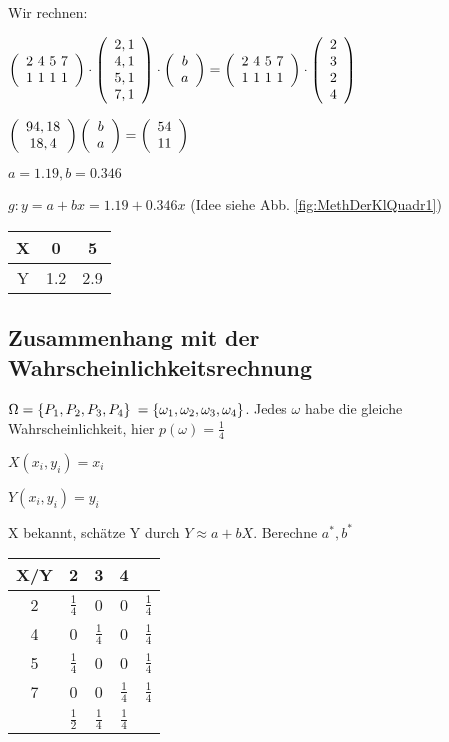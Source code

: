 Wir rechnen:

$
  \left(  \begin{array}{c} 2\ 4\ 5\ 7\\1\ 1\ 1\ 1 \end{array}  \right)  
\cdot
  \left(  \begin{array}{c} 2,1\\4,1\\5,1\\7,1 \end{array}  \right)  
\cdot
  \left(  \begin{array}{c} b\\a \end{array}  \right)  
=  \left(  \begin{array}{c} 2\ 4\ 5\ 7\\1\ 1\ 1\ 1 \end{array}  \right)  
\cdot 
  \left(  \begin{array}{c} 2\\3\\2\\4 \end{array}  \right)  
$

$
  \left(  \begin{array}{c} 94, 18\\18, 4 \end{array}  \right)  
  \left(  \begin{array}{c} b\\a \end{array}  \right)  
=
  \left(  \begin{array}{c} 54\\11 \end{array}  \right)  
$

$a = 1.19, b=0.346$

$g : y = a+bx = 1.19 + 0.346 x$ (Idee siehe Abb. \ref{fig:MethDerKlQuadr1})

\begin{tabular}{|c|c|c|}
\hline X & 0 & 5 \\ 
\hline Y & 1.2 & 2.9 \\ 
\hline 
\end{tabular} 

\subsection{Zusammenhang mit der Wahrscheinlichkeitsrechnung}
$ \Omega =  \left\lbrace P_1, P_2, P_3, P_4 \right\rbrace  $
$=  \left\lbrace \omega_1, \omega_2, \omega_3, \omega_4 \right\rbrace $.
Jedes $\omega$ habe die gleiche Wahrscheinlichkeit, hier $p(\omega) = \frac{1}{4}$

$X(x_i, y_i) = x_i$

$Y(x_i, y_i) = y_i$

X bekannt, schätze Y durch $Y\approx a + b X$. Berechne $a^*, b^*$

\begin{tabular}{|c|c|c|c|c|}
\hline X/Y & 2 & 3 & 4 &  \\ 
\hline 2 & $ \frac{1}{4} $ & 0 & 0 & $ \frac{1}{4} $ \\ 
\hline 4 & 0 & $ \frac{1}{4} $ & 0 & $ \frac{1}{4} $ \\ 
\hline 5 & $ \frac{1}{4} $ & 0 & 0 & $ \frac{1}{4} $ \\ 
\hline 7 & 0 & 0 & $ \frac{1}{4} $ & $ \frac{1}{4} $ \\ 
\hline & $ \frac{1}{2} $ & $ \frac{1}{4} $ & $ \frac{1}{4} $ & \\
\hline 
\end{tabular} 


